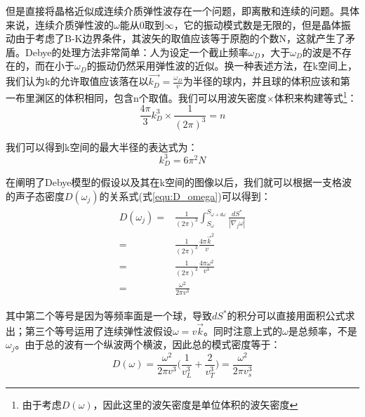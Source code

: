 \documentclass{ctexart}
\begin{document}
                但是直接将晶格近似成连续介质弹性波存在一个问题，即离散和连续的问题。具体来说，连续介质弹性波的$\omega$能从0取到$\infty$，它的振动模式数是无限的，但是晶体振动由于考虑了B-K边界条件，其波矢的取值应该等于原胞的个数N，这就产生了矛盾。Debye的处理方法非常简单：人为设定一个截止频率$\omega_D$，大于$\omega_D$的波是不存在的，而在小于$\omega_D$的振动仍然采用弹性波的近似。换一种表述方法，在k空间上，我们认为k的允许取值应该落在以$\vec{k_D}=\frac{\omega_D}{v}$为半径的球内，并且球的体积应该和第一布里渊区的体积相同，包含n个取值。我们可以用波矢密度$\times$体积来构建等式\footnote{由于考虑$D(\omega)$，因此这里的波矢密度是单位体积的波矢密度}：
                \begin{equation}
                    \frac{4\pi}{3}k_D^3\times \frac{1}{(2\pi)^3}=n
                \end{equation}
                
                我们可以得到k空间的最大半径的表达式为：
                \begin{equation}
                    k_D^3=6\pi^2 N
                \end{equation}
                
                在阐明了Debye模型的假设以及其在k空间的图像以后，我们就可以根据一支格波的声子态密度$D(\omega_j)$的关系式(式\eqref{equ:D_omega})可以得到：
                \begin{align}
                    \begin{split}
                     D(\omega_j)=&\frac{1}{(2\pi)^3}\int_{S_\omega}^{S_{\omega+d\omega}}\frac{dS^*}{|\nabla_j\omega|}\\
                     =&\frac{1}{(2\pi)^3}\frac{4\pi \vec{k}^2}{v}\\
                     =& \frac{1}{(2\pi)^3}\frac{4\pi\omega^2}{v^3}\\
                     =& \frac{\omega^2}{2\pi v^3}
                    \end{split}
                \end{align}
                
                其中第二个等号是因为等频率面是一个球，导致$dS^*$的积分可以直接用面积公式求出；第三个等号运用了连续弹性波假设$\omega=v\vec{k}$。同时注意上式的$\omega$是总频率，不是$\omega_j$。由于总的波有一个纵波两个横波，因此总的模式密度等于：
                \begin{equation}
                    D(\omega)=\frac{\omega^2}{2\pi v^3} \Big(\frac{1}{v_L^3}+\frac{2}{v_T^3}\Big)=\frac{\omega^2}{2\pi v_s^3}
                \end{equation}
                
\end{document}
